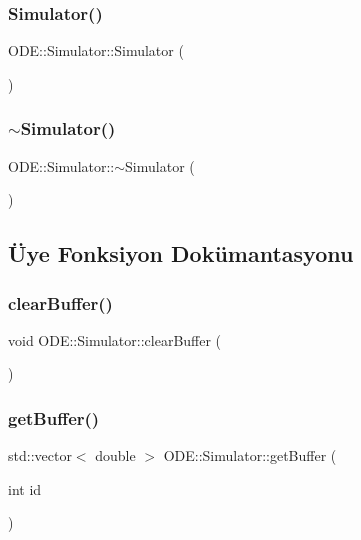 \subsubsection{\texorpdfstring{Simulator()}{Simulator()}}
{\footnotesize\ttfamily O\+D\+E\+::\+Simulator\+::\+Simulator (\begin{DoxyParamCaption}{ }\end{DoxyParamCaption})}

\mbox{\label{classODE_1_1Simulator_ac6e7a52f1089f80e75db50bf23f8ebbf}} 
\subsubsection{\texorpdfstring{$\sim$Simulator()}{~Simulator()}}
{\footnotesize\ttfamily O\+D\+E\+::\+Simulator\+::$\sim$\+Simulator (\begin{DoxyParamCaption}{ }\end{DoxyParamCaption})\hspace{0.3cm}{\ttfamily [virtual]}}



\subsection{Üye Fonksiyon Dokümantasyonu}
\mbox{\label{classODE_1_1Simulator_ac862b28aefa74dff04ed10f824eed99f}} 
\subsubsection{\texorpdfstring{clearBuffer()}{clearBuffer()}}
{\footnotesize\ttfamily void O\+D\+E\+::\+Simulator\+::clear\+Buffer (\begin{DoxyParamCaption}{ }\end{DoxyParamCaption})}

\mbox{\label{classODE_1_1Simulator_a57d62688ddf187773cc7b05bf28ac98f}} 
\subsubsection{\texorpdfstring{getBuffer()}{getBuffer()}}
{\footnotesize\ttfamily std\+::vector$<$ double $>$ O\+D\+E\+::\+Simulator\+::get\+Buffer (\begin{DoxyParamCaption}\item[{int}]{id }\end{DoxyParamCaption})}

